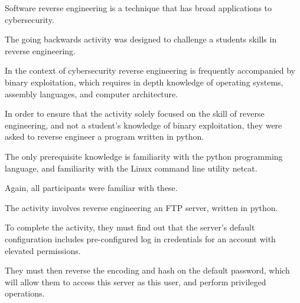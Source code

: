     Software reverse engineering is a technique that has broad applications to cybersecurity. %







The going backwards activity was designed to challenge a students skills in reverse engineering. %







In the context of cybersecurity reverse engineering is frequently accompanied by binary exploitation, which requires in depth knowledge of operating systems, assembly languages, and computer architecture. %







In order to ensure that the activity solely focused on the skill of reverse engineering, and not a student's knowledge of binary exploitation, they were asked to reverse engineer a program written in python. %







The only prerequisite knowledge is familiarity with the python programming language, and familiarity with the Linux command line utility netcat. %







Again, all participants were familiar with these.















    The activity involves reverse engineering an FTP server, written in python. %







To complete the activity, they must find out that the server's default configuration includes pre-configured log in credentials for an account with elevated permissions. %







They must then reverse the encoding and hash on the default password, which will allow them to access this server as this user, and perform privileged operations. 















